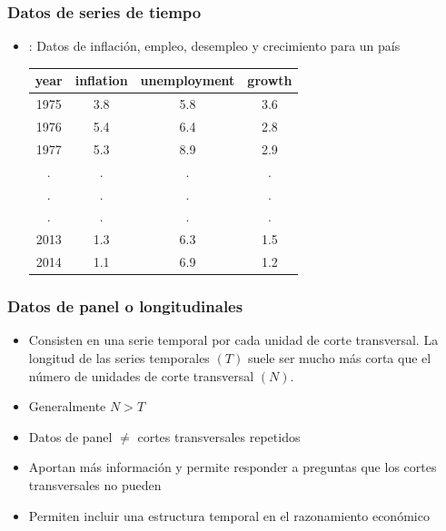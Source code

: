 \documentclass[t, compress, spanish, aspectratio=169]{beamer}
\newcommand{\term}[1]{\structure{\textbf{#1}}} %
\begin{document}
    \begin{frame}
        \frametitle{Datos de series de tiempo}
        \begin{itemize}
            \item \term{Ejemplo}: Datos de inflaci\'on, empleo, desempleo y crecimiento para un pa\'is
            
            \begin{table}
                \centering
                \begin{tabular}{cccc}
                    \hline
                    year & inflation & unemployment & growth \\ \hline
                    1975 & 3.8 & 5.8 & 3.6 \\
                    1976 & 5.4 & 6.4 & 2.8 \\
                    1977 & 5.3 & 8.9 & 2.9 \\
                    . & . & . & . \\
                    . & . & . & . \\
                    . & . & . & . \\
                    2013 & 1.3 & 6.3 & 1.5 \\
                    2014 & 1.1 & 6.9 & 1.2 \\ \hline
                \end{tabular}%
            \end{table}
        \end{itemize}
    \end{frame}
    
    \begin{frame}
        \frametitle{Datos de panel o longitudinales}
        \begin{itemize}
            \item Consisten en una serie temporal por cada unidad de corte transversal. La longitud de las series temporales $(T)$ suele ser mucho m\'as
            corta que el n\'umero de unidades de corte transversal $(N)$.
            \item Generalmente $N>T$
            \item Datos de panel $\neq$ cortes transversales repetidos
            \item Aportan m\'as informaci\'on y permite responder a preguntas que
            los cortes transversales no pueden
            \item Permiten incluir una estructura temporal en el razonamiento econ\'omico
        \end{itemize}
    \end{frame}
    
\end{document}
